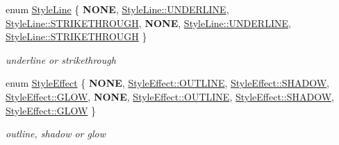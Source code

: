 \begin{DoxyCompactItemize}
\item 
enum \hyperlink{classMyXMLVisitor_a75a0b4e2723f798f35a0941ddba7c5a7}{Style\+Line} \{ \newline
{\bfseries N\+O\+NE}, 
\hyperlink{classMyXMLVisitor_a75a0b4e2723f798f35a0941ddba7c5a7a0086c73c90c261db630b4dc8aea09bcf}{Style\+Line\+::\+U\+N\+D\+E\+R\+L\+I\+NE}, 
\hyperlink{classMyXMLVisitor_a75a0b4e2723f798f35a0941ddba7c5a7aad166989fa2b7da7d238b3e7105c64f8}{Style\+Line\+::\+S\+T\+R\+I\+K\+E\+T\+H\+R\+O\+U\+GH}, 
{\bfseries N\+O\+NE}, 
\newline
\hyperlink{classMyXMLVisitor_a75a0b4e2723f798f35a0941ddba7c5a7a0086c73c90c261db630b4dc8aea09bcf}{Style\+Line\+::\+U\+N\+D\+E\+R\+L\+I\+NE}, 
\hyperlink{classMyXMLVisitor_a75a0b4e2723f798f35a0941ddba7c5a7aad166989fa2b7da7d238b3e7105c64f8}{Style\+Line\+::\+S\+T\+R\+I\+K\+E\+T\+H\+R\+O\+U\+GH}
 \}\begin{DoxyCompactList}\small\item\em underline or strikethrough \end{DoxyCompactList}
\item 
enum \hyperlink{classMyXMLVisitor_a7f84d816c0b481e9cb35884996af6c2c}{Style\+Effect} \{ \newline
{\bfseries N\+O\+NE}, 
\hyperlink{classMyXMLVisitor_a7f84d816c0b481e9cb35884996af6c2ca6a656275b77dd69c1cc1f49c58859151}{Style\+Effect\+::\+O\+U\+T\+L\+I\+NE}, 
\hyperlink{classMyXMLVisitor_a7f84d816c0b481e9cb35884996af6c2ca8160fba05a5a291372a94bc22b55f62b}{Style\+Effect\+::\+S\+H\+A\+D\+OW}, 
\hyperlink{classMyXMLVisitor_a7f84d816c0b481e9cb35884996af6c2cac1f6db55d4aa7ba3eda97848763b6489}{Style\+Effect\+::\+G\+L\+OW}, 
\newline
{\bfseries N\+O\+NE}, 
\hyperlink{classMyXMLVisitor_a7f84d816c0b481e9cb35884996af6c2ca6a656275b77dd69c1cc1f49c58859151}{Style\+Effect\+::\+O\+U\+T\+L\+I\+NE}, 
\hyperlink{classMyXMLVisitor_a7f84d816c0b481e9cb35884996af6c2ca8160fba05a5a291372a94bc22b55f62b}{Style\+Effect\+::\+S\+H\+A\+D\+OW}, 
\hyperlink{classMyXMLVisitor_a7f84d816c0b481e9cb35884996af6c2cac1f6db55d4aa7ba3eda97848763b6489}{Style\+Effect\+::\+G\+L\+OW}
 \}\begin{DoxyCompactList}\small\item\em outline, shadow or glow \end{DoxyCompactList}
\end{DoxyCompactItemize}
